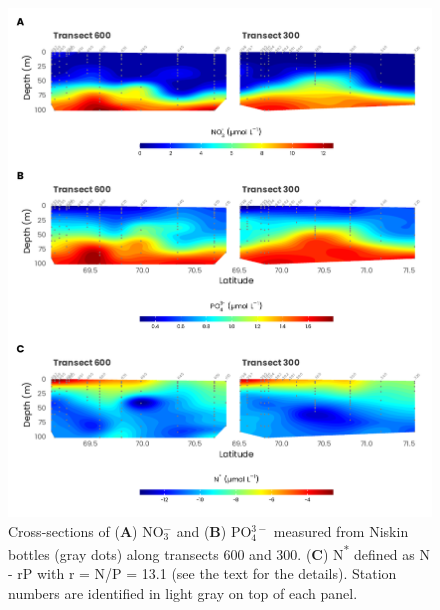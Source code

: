\documentclass[essd, manuscript]{copernicus}
\begin{document}
\begin{figure}[H]
    \centering
    \includegraphics[scale = 0.85]{../../../graphs/fig08.pdf}
    \caption{Cross-sections of (\textbf{A}) NO$_3^-$ and (\textbf{B}) PO$_4^{3-}$ measured from Niskin bottles (gray dots) along transects 600 and 300. (\textbf{C}) N\textsuperscript{*} defined as N - rP with r = N/P = 13.1 (see the text for the details). Station numbers are identified in light gray on top of each panel.}
\end{figure}

\clearpage
\end{document}
